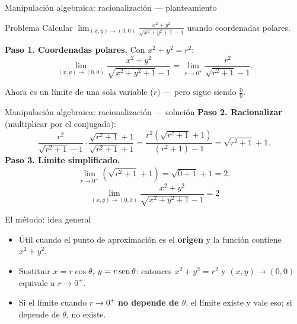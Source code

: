 \documentclass[11pt,aspectratio=169]{beamer}
\begin{document}
\begin{frame}{Manipulación algebraica: racionalización --- planteamiento}
  \begin{block}{Problema}
    Calcular
    $\displaystyle\lim_{(x,y)\to(0,0)}\frac{x^2+y^2}{\sqrt{x^2+y^2+1}-1}$
    usando coordenadas polares.
  \end{block}
  \pause
  \textbf{Paso 1. Coordenadas polares.} Con $x^2+y^2=r^2$:
  \[
    \lim_{(x,y)\to(0,0)}\frac{x^2+y^2}{\sqrt{x^2+y^2+1}-1}
    =\lim_{r\to 0^+}\frac{r^2}{\sqrt{r^2+1}-1}.
  \]
  \pause
  \begin{center}\small\color{gray60} Ahora es un límite de una sola variable ($r$) --- pero sigue siendo $\tfrac00$.\end{center}
\end{frame}

\begin{frame}{Manipulación algebraica: racionalización --- solución}
  \textbf{Paso 2. Racionalizar} (multiplicar por el conjugado):
  \[
    \frac{r^2}{\sqrt{r^2+1}-1}\cdot\frac{\sqrt{r^2+1}+1}{\sqrt{r^2+1}+1}
    =\frac{r^2\left(\sqrt{r^2+1}+1\right)}{(r^2+1)-1}
    =\sqrt{r^2+1}+1.
  \]
  \pause
  \textbf{Paso 3. Límite simplificado.}
  \[
    \lim_{r\to 0^+}\left(\sqrt{r^2+1}+1\right)=\sqrt{0+1}+1=2.
  \]
  \pause
  \[
    \boxed{\lim_{(x,y)\to(0,0)}\frac{x^2+y^2}{\sqrt{x^2+y^2+1}-1}=2}
  \]
\end{frame}


\begin{frame}{El método: idea general}
  \begin{itemize}
    \item Útil cuando el punto de aproximación es el \textbf{origen} y la función contiene $x^2+y^2$.
    \pause
    \item Sustituir $x=r\cos\theta$, $y=r\operatorname{sen}\theta$: entonces $x^2+y^2=r^2$ y $(x,y)\to(0,0)$ equivale a $r\to 0^+$.
    \pause
    \item Si el límite cuando $r\to 0^+$ \textbf{no depende de $\theta$}, el límite existe y vale eso; si depende de $\theta$, no existe.
  \end{itemize}
  \vspace{8pt}
  \pause
\end{frame}
\end{document}
